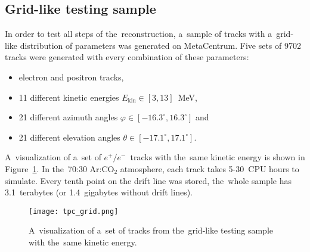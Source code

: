 		\subsection{Grid-like testing sample}
		\label{sec:microgrid}
			In order to test all steps of the~reconstruction, a~sample of tracks with a~grid-like distribution of parameters was generated on MetaCentrum. Five sets of 9702 tracks were generated with every combination of these parameters:
				\begin{itemize}[nosep]
					\item electron and positron tracks,
					\item 11 different kinetic energies $E_\text{kin}\in[3,13]$~MeV,
					\item 21 different azimuth angles $\varphi \in [-16.3^\circ,16.3^\circ]$ and
					\item 21 different elevation angles $\theta \in [-17.1^\circ,17.1^\circ]$.
				\end{itemize}
			A~visualization of a~set of $e^+/e^-$~tracks with the~same kinetic energy is shown in Figure~\ref{fig:microgrid}. In the~70:30 Ar:CO$_2$ atmosphere, each track takes 5-30~CPU hours to simulate. Every tenth point on the drift line was stored, the~whole sample has 3.1~terabytes (or 1.4~gigabytes without drift lines).
			
				\begin{figure}
					\centering
					\texttt{[image: tpc\_grid.png]}
					\caption{A~visualization of a~set of tracks from the~grid-like testing sample with the~same kinetic energy.}
					\label{fig:microgrid}
				\end{figure}
	
